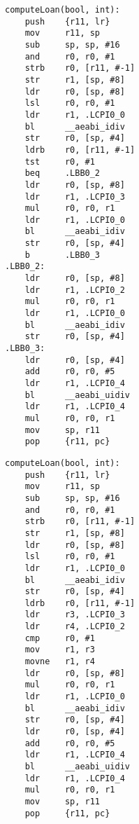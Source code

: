 \begin{minipage}{0.45\textwidth}
    \begin{lstlisting}[style=AsmStyle, basicstyle=\fontsize{4}{5}\selectfont\ttfamily]
computeLoan(bool, int):
    push    {r11, lr}
    mov     r11, sp
    sub     sp, sp, #16
    and     r0, r0, #1
    strb    r0, [r11, #-1]
    str     r1, [sp, #8]
    ldr     r0, [sp, #8]
    lsl     r0, r0, #1
    ldr     r1, .LCPI0_0
    bl      __aeabi_idiv
    str     r0, [sp, #4]
    ldrb    r0, [r11, #-1]
    tst     r0, #1
    beq     .LBB0_2
    ldr     r0, [sp, #8]
    ldr     r1, .LCPI0_3
    mul     r0, r0, r1
    ldr     r1, .LCPI0_0
    bl      __aeabi_idiv
    str     r0, [sp, #4]
    b       .LBB0_3
.LBB0_2:
    ldr     r0, [sp, #8]
    ldr     r1, .LCPI0_2
    mul     r0, r0, r1
    ldr     r1, .LCPI0_0
    bl      __aeabi_idiv
    str     r0, [sp, #4]
.LBB0_3:
    ldr     r0, [sp, #4]
    add     r0, r0, #5
    ldr     r1, .LCPI0_4
    bl      __aeabi_uidiv
    ldr     r1, .LCPI0_4
    mul     r0, r0, r1
    mov     sp, r11
    pop     {r11, pc}
    \end{lstlisting}
\end{minipage}%
\hspace{1cm}
\begin{minipage}{0.45\textwidth}
    \begin{lstlisting}[style=AsmStyle, numbers=right,  basicstyle=\fontsize{4}{5}\selectfont\ttfamily, belowskip=8.5\baselineskip]
computeLoan(bool, int):
    push    {r11, lr}
    mov     r11, sp
    sub     sp, sp, #16
    and     r0, r0, #1
    strb    r0, [r11, #-1]
    str     r1, [sp, #8]
    ldr     r0, [sp, #8]
    lsl     r0, r0, #1
    ldr     r1, .LCPI0_0
    bl      __aeabi_idiv
    str     r0, [sp, #4]
    ldrb    r0, [r11, #-1]
    ldr     r3, .LCPI0_3
    ldr     r4, .LCPI0_2
    cmp     r0, #1
    mov     r1, r3
    movne   r1, r4
    ldr     r0, [sp, #8]
    mul     r0, r0, r1
    ldr     r1, .LCPI0_0
    bl      __aeabi_idiv
    str     r0, [sp, #4]
    ldr     r0, [sp, #4]
    add     r0, r0, #5
    ldr     r1, .LCPI0_4
    bl      __aeabi_uidiv
    ldr     r1, .LCPI0_4
    mul     r0, r0, r1
    mov     sp, r11
    pop     {r11, pc} 
    \end{lstlisting}
\end{minipage}%
